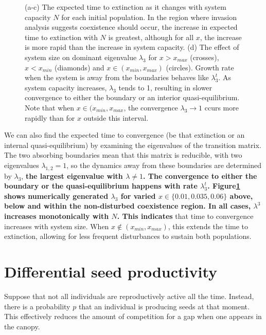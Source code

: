 \begin{figure}[th]
   \caption[How time to extinction varies with system capacity]{(a-c) The expected time to extinction as it changes with system capacity $N$ for each initial population. In the region where invasion analysis suggests coexistence should occur, the increase in expected time to extinction with $N$ is greatest, although for all $x$, the increase is more rapid than the increase in system capacity. (d) The effect of system size on dominant eigenvalue $\lambda_3$ for $x>x_{max}$ (crosses), $x<x_{min}$ (diamonds) and $x \in(x_{min},x_{max})$ (circles). Growth rate when the system is away from the boundaries behaves like $\lambda_3^t$. As system capacity increases, $\lambda_3$ tends to 1, resulting in slower convergence to either the boundary or an interior quasi-equilibrium. Note that when $x \in (x_{min},x_{max}$, the convergence $\lambda_3 \to 1$ ccurs more rapidly than for $x$ outside this interval.}
 \label{fig:tte}
\end{figure}

We can also find the expected time to convergence (be that extinction or an internal quasi-equilibrium) by examining the eigenvalues of the transition matrix. The two absorbing boundaries mean that this matrix is reducible, with two eigenvalues $\lambda_{1,2}=1$, so the dynamics away from these boundaries are determined by $\lambda_3$, \textbf{the largest eigenvalue with $\lambda \neq 1$. The convergence to either the boundary or the quasi-equilibrium happens with rate $\lambda_3^t$. Figure\ref{fig:tte} shows numerically generated $\lambda_3$ for varied $x \in \{0.01,0.035,0.06\}$ above, below and within the non-disturbed coexistence region. In all cases, $\lambda^3$ increases monotonically with $N$. This indicates} that time to convergence increases with system size. When $x \not\in (x_{min},x_{max})$, this extends the time to extinction, allowing for less frequent disturbances to sustain both populations.



 \section{Differential seed productivity}
\label{app2c}
Suppose that not all individuals are reproductively active all the time. Instead, there is a probability  $p$ that an individual is producing seeds at that moment. This effectively reduces the amount of competition for a gap when one appears in the canopy.


